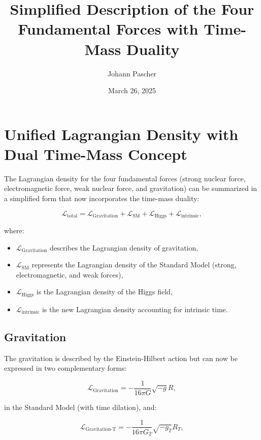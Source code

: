 \documentclass{article}
\title{Simplified Description of the Four Fundamental Forces with Time-Mass Duality}
\author{Johann Pascher}
\date{March 26, 2025}
\begin{document}
\maketitle

\tableofcontents
\newpage

\section{Unified Lagrangian Density with Dual Time-Mass Concept}

The Lagrangian density for the four fundamental forces (strong nuclear force, electromagnetic force, weak nuclear force, and gravitation) can be summarized in a simplified form that now incorporates the time-mass duality:

\begin{equation}
	\mathcal{L}_\text{total} = \mathcal{L}_\text{Gravitation} + \mathcal{L}_\text{SM} + \mathcal{L}_\text{Higgs} + \mathcal{L}_\text{intrinsic},
\end{equation}

where:
\begin{itemize}
	\item \(\mathcal{L}_\text{Gravitation}\) describes the Lagrangian density of gravitation,
	\item \(\mathcal{L}_\text{SM}\) represents the Lagrangian density of the Standard Model (strong, electromagnetic, and weak forces),
	\item \(\mathcal{L}_\text{Higgs}\) is the Lagrangian density of the Higgs field,
	\item \(\mathcal{L}_\text{intrinsic}\) is the new Lagrangian density accounting for intrinsic time.
\end{itemize}

\subsection{Gravitation}
The gravitation is described by the Einstein-Hilbert action but can now be expressed in two complementary forms:

\begin{equation}
	\mathcal{L}_\text{Gravitation} = -\frac{1}{16\pi G} \sqrt{-g} R,
\end{equation}

in the Standard Model (with time dilation), and:

\begin{equation}
	\mathcal{L}_\text{Gravitation-T} = -\frac{1}{16\pi G_T} \sqrt{-g_T} R_T,
\end{equation}
\end{document}
